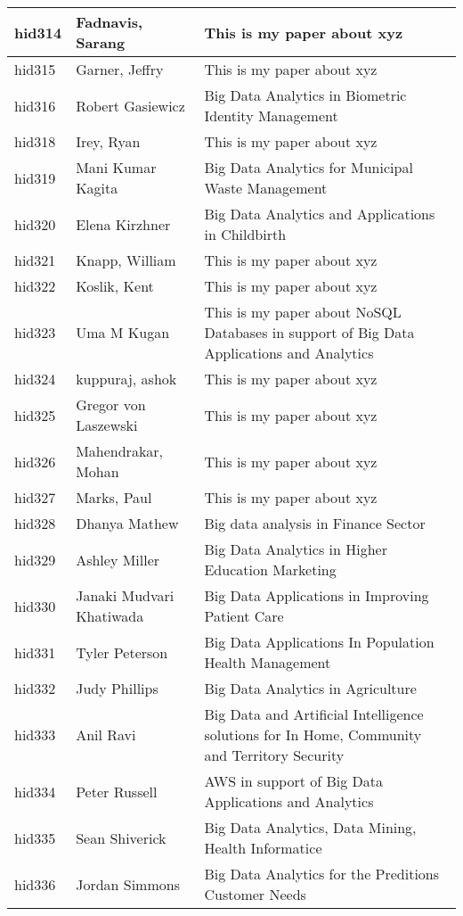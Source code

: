 \documentclass[12pt]{article}
\begin{document}
\begin{footnotesize}
\begin{longtable}{|p{1cm}p{5cm}p{9cm}|}
\hline
hid314 & Fadnavis, Sarang & This is my paper about xyz  \\
\hline
hid315 & Garner, Jeffry & This is my paper about xyz  \\
\hline
hid316 & Robert Gasiewicz & Big Data Analytics in Biometric Identity Management  \\
\hline
hid318 & Irey, Ryan & This is my paper about xyz  \\
\hline
hid319 & Mani Kumar Kagita & Big Data Analytics for Municipal Waste Management  \\
\hline
hid320 & Elena Kirzhner & Big Data Analytics and Applications in Childbirth  \\
\hline
hid321 & Knapp, William & This is my paper about xyz  \\
\hline
hid322 & Koslik, Kent & This is my paper about xyz  \\
\hline
hid323 & Uma M Kugan & This is my paper about NoSQL Databases in support of Big Data Applications and Analytics  \\
\hline
hid324 & kuppuraj, ashok & This is my paper about xyz  \\
\hline
hid325 & Gregor von Laszewski & This is my paper about xyz  \\
\hline
hid326 & Mahendrakar, Mohan & This is my paper about xyz  \\
\hline
hid327 & Marks, Paul & This is my paper about xyz  \\
\hline
hid328 & Dhanya Mathew & Big data analysis in Finance Sector  \\
\hline
hid329 & Ashley Miller & Big Data Analytics in Higher Education Marketing  \\
\hline
hid330 & Janaki Mudvari Khatiwada & Big Data Applications in Improving Patient Care  \\
\hline
hid331 & Tyler Peterson & Big Data Applications In Population Health Management  \\
\hline
hid332 & Judy Phillips & Big Data Analytics in Agriculture  \\
\hline
hid333 & Anil Ravi & Big Data and Artificial Intelligence solutions for In Home, Community and Territory Security  \\
\hline
hid334 & Peter Russell & AWS in support of Big Data Applications and Analytics  \\
\hline
hid335 & Sean Shiverick & Big Data Analytics, Data Mining, Health Informatice  \\
\hline
hid336 & Jordan Simmons & Big Data Analytics for the Preditions Customer Needs  \\

\end{longtable}
\end{footnotesize}
\end{document}
